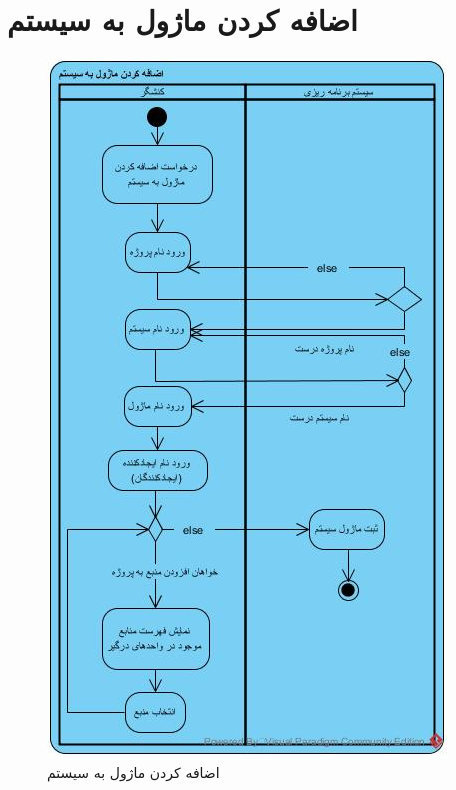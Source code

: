 \section{اضافه کردن ماژول به سیستم}
\begin{figure}[H]
	\centering
	\includegraphics[scale=0.7]{img/activity/AddModuleToSystem}
	\caption{اضافه کردن ماژول به سیستم}
\end{figure}

